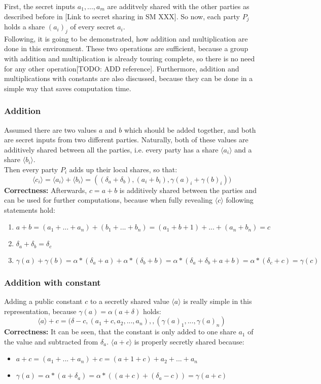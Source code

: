 \documentclass[english,runningheads,a4paper]{llncs}[2018/03/10]
\begin{document}
First, the secret inputs  $a_1,...,a_m$ are additvely shared with the other parties as described before in [Link to secret sharing in SM XXX]. So now, each party $P_j$ holds a share ${(a_i)}_j$ of every secret $a_i$.\\

Following, it is going to be demonstrated, how addition and multiplication are done in this environment. These two operations are sufficient, because a group with addition and multiplication is already touring complete, so there is no need for any other operation[TODO: ADD reference]. Furthermore, addition and multiplications with constants are also discussed, because they can be done in a simple way that saves computation time.\\

\subsubsection{Addition}
Assumed there are two values \( a\) and \( b\) which should be added together, and both are secret inputs from two different parties. Naturally, both of these values are additively shared between all the parties, i.e. every party has a share \( \langle a_i\rangle\) and a share \( \langle b_i\rangle\).\\

Then every party \( P_i\) adds up their local shares, so that:\\
$$\langle c_i\rangle=\langle a_i\rangle+\langle b_i\rangle=((\delta_a+\delta_b),(a_i+b_i),\gamma (a)_i+\gamma (b)_i))$$
\textbf{Correctness:} Afterwards, \( c=a+b\) is additively shared between the parties and can be used for further computations, because when fully revealing $\langle c\rangle$ following statements hold:
\begin{enumerate}
\item $a+b=(a_1+...+a_n)+(b_1+...+b_n)=(a_1+b+1)+...+(a_n+b_n)=c$
\item $\delta_a+\delta_b=\delta_c$
\item $\gamma(a)+\gamma(b)=\alpha*(\delta_a+a)+\alpha*(\delta_b+b)=\alpha*(\delta_a+\delta_b+a+b)=\alpha*(\delta_c+c)=\gamma(c)$
\end{enumerate}

\subsubsection{Addition with constant}
Adding a public constant $c$ to a secretly shared value $ \langle a\rangle $ is really simple in this representation, because \( \gamma (a)=\alpha(a+\delta)\) holds:\\
$$\langle a\rangle+c=(\delta-c,(a_1+c,a_2,...,a_n),,(\gamma (a)_1,...,\gamma (a)_n)$$
\textbf{Correctness:} It can be seen, that the constant is only added to one share $a_1$ of the value and subtracted from \( \delta_a\). \( \langle a+c \rangle \) is properly secretly shared because:
\begin{itemize}
\item $a+c=(a_1+...+a_n)+c=(a+1+c)+a_2+...+a_n$
\item \( \gamma(a)=\alpha*(a+\delta_a)=\alpha*((a+c)+(\delta_a-c))=\gamma(a+c)\)
\end{itemize}
\end{document}
